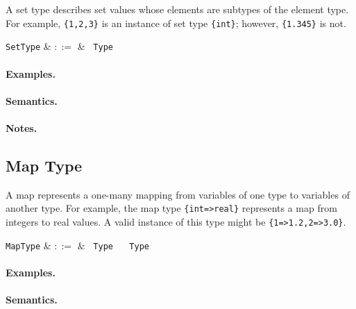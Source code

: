 A set type describes set values whose elements are subtypes of the element type. For example, \lstinline|{1,2,3}| is an instance of set type \lstinline|{int}|; however, \lstinline|{1.345}| is not.

\begin{syntax}
  \verb+SetType+ & $::=$ & \token{\{} \ \verb+Type+ \ \token{\}} \\
\end{syntax}

\paragraph{Examples.}

\paragraph{Semantics.}

\paragraph{Notes.} 


\subsection{Map Type}

A map represents a one-many mapping from variables of one type to variables of another type. For example, the map type \lstinline|{int=>real}| represents a map from integers to real values. A valid instance of this type might be \lstinline|{1=>1.2,2=>3.0}|.

\begin{syntax}
  \verb+MapType+ & $::=$ & \token{\{} \ \verb+Type+ \ \token{=>} \ \verb+Type+ \ \token{\}} \\
\end{syntax}

\paragraph{Examples.}

\paragraph{Semantics.}

